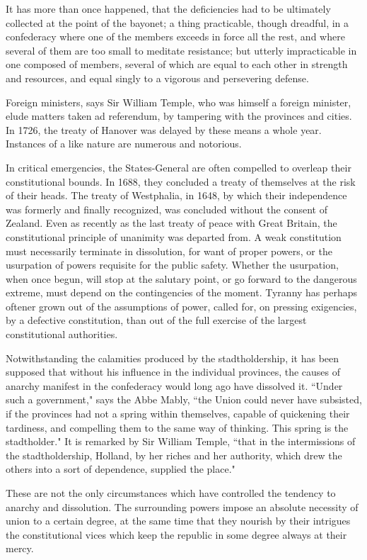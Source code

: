 It has more than once happened, that the deficiencies had to be ultimately collected at the point of the bayonet; a thing practicable, though dreadful, in a confederacy where one of the members exceeds in force all the rest, and where several of them are too small to meditate resistance; but utterly impracticable in one composed of members, several of which are equal to each other in strength and resources, and equal singly to a vigorous and persevering defense.

Foreign ministers, says Sir William Temple, who was himself a foreign minister, elude matters taken ad referendum, by tampering with the provinces and cities. 
In 1726, the treaty of Hanover was delayed by these means a whole year. 
Instances of a like nature are numerous and notorious.

In critical emergencies, the States-General are often compelled to overleap their constitutional bounds. 
In 1688, they concluded a treaty of themselves at the risk of their heads. 
The treaty of Westphalia, in 1648, by which their independence was formerly and finally recognized, was concluded without the consent of Zealand. 
Even as recently as the last treaty of peace with Great Britain, the constitutional principle of unanimity was departed from. 
A weak constitution must necessarily terminate in dissolution, for want of proper powers, or the usurpation of powers requisite for the public safety. 
Whether the usurpation, when once begun, will stop at the salutary point, or go forward to the dangerous extreme, must depend on the contingencies of the moment. 
Tyranny has perhaps oftener grown out of the assumptions of power, called for, on pressing exigencies, by a defective constitution, than out of the full exercise of the largest constitutional authorities.

Notwithstanding the calamities produced by the stadtholdership, it has been supposed that without his influence in the individual provinces, the causes of anarchy manifest in the confederacy would long ago have dissolved it. 
``Under such a government," says the Abbe Mably, ``the Union could never have subsisted, if the provinces had not a spring within themselves, capable of quickening their tardiness, and compelling them to the same way of thinking. 
This spring is the stadtholder." It is remarked by Sir William Temple, ``that in the intermissions of the stadtholdership, Holland, by her riches and her authority, which drew the others into a sort of dependence, supplied the place."

These are not the only circumstances which have controlled the tendency to anarchy and dissolution. 
The surrounding powers impose an absolute necessity of union to a certain degree, at the same time that they nourish by their intrigues the constitutional vices which keep the republic in some degree always at their mercy.

